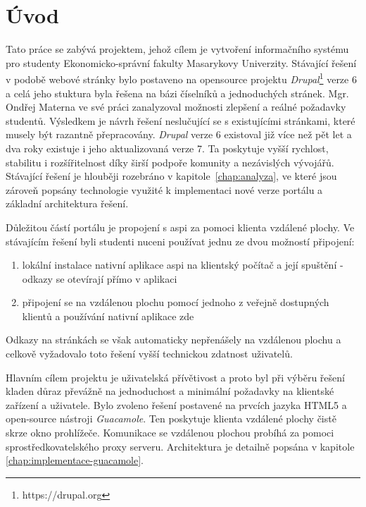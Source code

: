 \chapter{Úvod}
Tato práce se zabývá projektem, jehož cílem je vytvoření informačního systému pro studenty Ekonomicko-správní fakulty Masarykovy Univerzity. Stávající řešení v podobě webové stránky bylo postaveno na \gls{opensource} projektu \emph{Drupal}\footnote{https://drupal.org} verze 6 a celá jeho stuktura byla řešena na bázi číselníků a jednoduchých stránek. Mgr. Ondřej Materna ve své práci zanalyzoval možnosti zlepšení a reálné požadavky studentů. Výsledkem je návrh řešení neslučující se s existujícími stránkami, které musely být razantně přepracovány. \emph{Drupal} verze 6 existoval již více než pět let a dva roky existuje i jeho aktualizovaná verze 7\cite{website:wiki:drupal}. Ta poskytuje vyšší rychlost, stabilitu i rozšířitelnost díky širší podpoře komunity a nezávislých vývojářů. Stávající řešení je hlouběji rozebráno v kapitole~\ref{chap:analyza}, ve které jsou zároveň popsány technologie využité k implementaci nové verze portálu a základní architektura řešení.

Důležitou částí portálu je propojení s \gls{aspi} za pomoci klienta vzdálené plochy. Ve stávajícím řešení byli studenti nuceni používat jednu ze dvou možností připojení:

\begin{enumerate}
  \item lokální instalace nativní aplikace \gls{aspi} na klientský počítač a  její spuštění - odkazy se otevírají přímo v aplikaci
  \item připojení se na vzdálenou plochu pomocí jednoho z veřejně dostupných klientů a používání nativní aplikace zde
\end{enumerate}

Odkazy na stránkách se však automaticky nepřenášely na vzdálenou plochu a celkově vyžadovalo toto řešení vyšší technickou zdatnost uživatelů.

Hlavním cílem projektu je uživatelská přívětivost a proto byl při výběru řešení kladen důraz převážně na jednoduchost a minimální požadavky na klientské zařízení a uživatele. Bylo zvoleno řešení postavené na prvcích jazyka HTML5 a open-source nástroji \emph{Guacamole}. Ten poskytuje klienta vzdálené plochy čistě skrze okno prohlížeče. Komunikace se vzdálenou plochou probíhá za pomoci sprostředkovatelského proxy serveru. Architektura je detailně popsána v kapitole \ref{chap:implementace-guacamole}.

